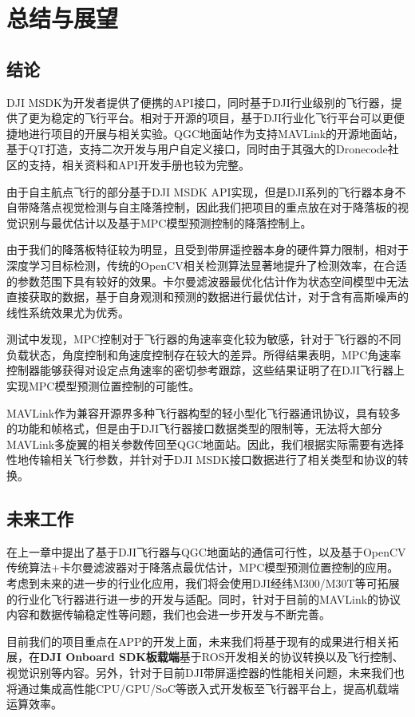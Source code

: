 \chapter{总结与展望}

\section{结论}

DJI MSDK为开发者提供了便携的API接口，同时基于DJI行业级别的飞行器，提供了更为稳定的飞行平台。相对于开源的项目，基于DJI行业化飞行平台可以更便捷地进行项目的开展与相关实验。QGC地面站作为支持MAVLink的开源地面站，基于QT打造，支持二次开发与用户自定义接口，同时由于其强大的Dronecode社区的支持，相关资料和API开发手册也较为完整。

由于自主航点飞行的部分基于DJI MSDK API实现，但是DJI系列的飞行器本身不自带降落点视觉检测与自主降落控制，因此我们把项目的重点放在对于降落板的视觉识别与最优估计以及基于MPC模型预测控制的降落控制上。

由于我们的降落板特征较为明显，且受到带屏遥控器本身的硬件算力限制，相对于深度学习目标检测，传统的OpenCV相关检测算法显著地提升了检测效率，在合适的参数范围下具有较好的效果。卡尔曼滤波器最优化估计作为状态空间模型中无法直接获取的数据，基于自身观测和预测的数据进行最优估计，对于含有高斯噪声的线性系统效果尤为优秀。

测试中发现，MPC控制对于飞行器的角速率变化较为敏感，针对于飞行器的不同负载状态，角度控制和角速度控制存在较大的差异。所得结果表明，MPC角速率控制器能够获得对设定点角速率的密切参考跟踪，这些结果证明了在DJI飞行器上实现MPC模型预测位置控制的可能性\cite{ArtE8}。

MAVLink作为兼容开源界多种飞行器构型的轻小型化飞行器通讯协议，具有较多的功能和帧格式，但是由于DJI飞行器接口数据类型的限制等，无法将大部分MAVLink多旋翼的相关参数传回至QGC地面站。因此，我们根据实际需要有选择性地传输相关飞行参数，并针对于DJI MSDK接口数据进行了相关类型和协议的转换。

\section{未来工作}

在上一章中提出了基于DJI飞行器与QGC地面站的通信可行性，以及基于OpenCV传统算法+卡尔曼滤波器对于降落点最优估计，MPC模型预测位置控制的应用。考虑到未来的进一步的行业化应用，我们将会使用DJI经纬M300/M30T等可拓展的行业化飞行器进行进一步的开发与适配。同时，针对于目前的MAVLink的协议内容和数据传输稳定性等问题，我们也会进一步开发与不断完善。

目前我们的项目重点在APP的开发上面，未来我们将基于现有的成果进行相关拓展，在\textbf{DJI Onboard SDK板载端}基于ROS开发相关的协议转换以及飞行控制、视觉识别等内容。另外，针对于目前DJI带屏遥控器的性能相关问题，未来我们也将通过集成高性能CPU/GPU/SoC等嵌入式开发板至飞行器平台上，提高机载端运算效率。
